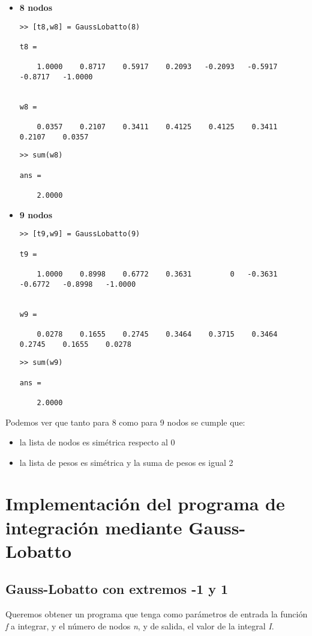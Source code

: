 \documentclass[a4paper]{article}
\begin{document}
\begin{itemize}
\item \textbf{8 nodos}
\begin{lstlisting}[frame=single, style=Matlab-Pyglike]
>> [t8,w8] = GaussLobatto(8)

t8 =

    1.0000    0.8717    0.5917    0.2093   -0.2093   -0.5917   -0.8717   -1.0000


w8 =

    0.0357    0.2107    0.3411    0.4125    0.4125    0.3411    0.2107    0.0357
\end{lstlisting}
\begin{lstlisting}[frame=single, style=Matlab-Pyglike]
>> sum(w8)

ans =

    2.0000
\end{lstlisting}

\item \textbf{9 nodos}
\begin{lstlisting}[frame=single, style=Matlab-Pyglike]
>> [t9,w9] = GaussLobatto(9)

t9 =

    1.0000    0.8998    0.6772    0.3631         0   -0.3631   -0.6772   -0.8998   -1.0000


w9 =

    0.0278    0.1655    0.2745    0.3464    0.3715    0.3464    0.2745    0.1655    0.0278
\end{lstlisting}

\begin{lstlisting}[frame=single, style=Matlab-Pyglike]
>> sum(w9)

ans =

    2.0000
\end{lstlisting}
\end{itemize}

Podemos ver que tanto para 8 como para 9 nodos se cumple que:
\begin{itemize}
    \item la lista de nodos es simétrica respecto al 0
    \item la lista de pesos es simétrica y la suma de pesos es igual 2
\end{itemize}
\section{Implementación del programa de integración mediante Gauss-Lobatto}

\subsection{Gauss-Lobatto con extremos -1 y 1}
Queremos obtener un programa que tenga como parámetros de entrada la función \textit{f} a integrar, y el número de nodos \textit{n}, y de salida, el valor de la integral \textit{I}.
\end{document}
